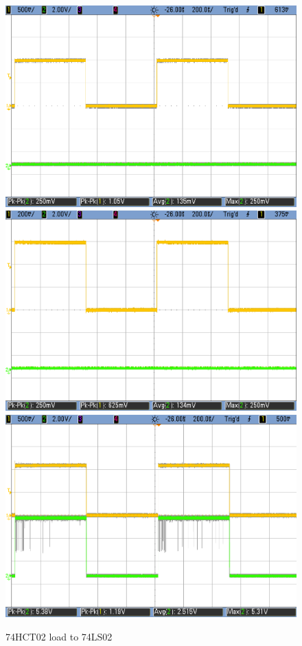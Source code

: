 \begin{figure}[h!]
	   \includegraphics[scale=0.18]{../Exercise2/HCT-LS-1V.png}\\
	   \vspace{0.2cm}
        \includegraphics[scale=0.18]{../Exercise2/HCT-LS-0p6V.png}\hspace{1cm}
        \includegraphics[scale=0.18]{../Exercise2/LS-HCT-1p1V.png}
        \caption{\color{cyan}74HCT02 load to 74LS02}
        \label{fig:ej2exhcttols}
    \end{figure}
    
